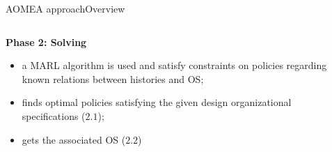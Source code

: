 \begin{frame}{AOMEA approach}{Overview}

    \begin{columns}

        \begin{column}{0.5\textwidth}

            \textbf{Phase 2: Solving}

            \begin{itemize}
                \item a MARL algorithm is used and satisfy constraints on policies regarding known relations between histories and OS;
                \item finds optimal policies satisfying the given design organizational specifications ($2.1$);
                \item gets the associated OS ($2.2$)
            \end{itemize}

        \end{column}

        \begin{column}{0.5\textwidth}
            \centering
        \end{column}


\end{columns}
\end{frame}
